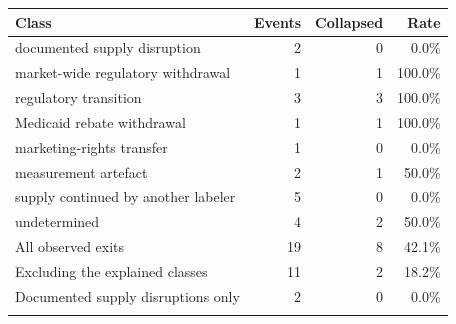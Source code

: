 \begin{tabular}{@{}lrrr@{}}
\toprule
Class & Events & Collapsed & Rate \\
\midrule
documented supply disruption & 2 & 0 & 0.0\% \\
market-wide regulatory withdrawal & 1 & 1 & 100.0\% \\
regulatory transition & 3 & 3 & 100.0\% \\
Medicaid rebate withdrawal & 1 & 1 & 100.0\% \\
marketing-rights transfer & 1 & 0 & 0.0\% \\
measurement artefact & 2 & 1 & 50.0\% \\
supply continued by another labeler & 5 & 0 & 0.0\% \\
undetermined & 4 & 2 & 50.0\% \\
\midrule
All observed exits & 19 & 8 & 42.1\% \\
Excluding the explained classes & 11 & 2 & 18.2\% \\
Documented supply disruptions only & 2 & 0 & 0.0\% \\
\botrule
\end{tabular}
